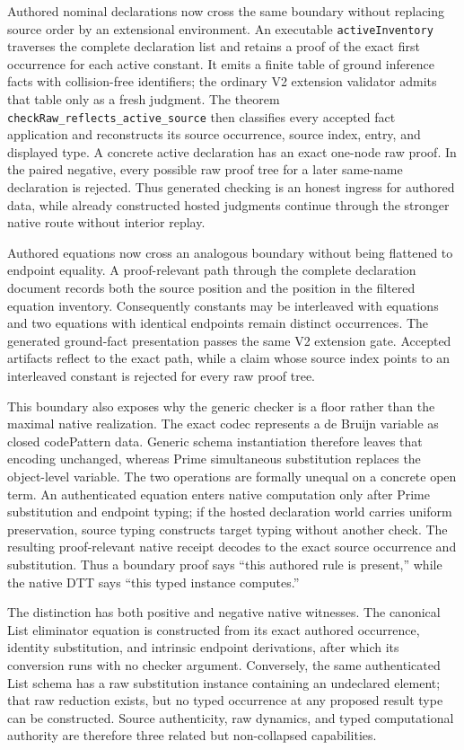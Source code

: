 \documentclass[11pt]{article}
\newcommand{\code}[1]{\texttt{#1}}
\begin{document}
Authored nominal declarations now cross the same boundary without replacing
source order by an extensional environment.  An executable
\code{activeInventory} traverses the complete declaration list and retains a
proof of the exact first occurrence for each active constant.  It emits a
finite table of ground inference facts with collision-free identifiers; the
ordinary V2 extension validator admits that table only as a fresh judgment.
The theorem \code{checkRaw\_reflects\_active\_source} then classifies every
accepted fact application and reconstructs its source occurrence, source
index, entry, and displayed type.  A concrete active declaration has an exact
one-node raw proof.  In the paired negative, every possible raw proof tree for
a later same-name declaration is rejected.  Thus generated checking is an
honest ingress for authored data, while already constructed hosted judgments
continue through the stronger native route without interior replay.

Authored equations now cross an analogous boundary without being flattened to
endpoint equality.  A proof-relevant path through the complete declaration
document records both the source position and the position in the filtered
equation inventory.  Consequently constants may be interleaved with equations
and two equations with identical endpoints remain distinct occurrences.  The
generated ground-fact presentation passes the same V2 extension gate.  Accepted
artifacts reflect to the exact path, while a claim whose source index points to
an interleaved constant is rejected for every raw proof tree.

This boundary also exposes why the generic checker is a floor rather than the
maximal native realization.  The exact codec represents a de Bruijn variable as
closed code{Pattern} data.  Generic schema instantiation therefore leaves that
encoding unchanged, whereas Prime simultaneous substitution replaces the
object-level variable.  The two operations are formally unequal on a concrete
open term.  An authenticated equation enters native computation only after
Prime substitution and endpoint typing; if the hosted declaration world carries
uniform preservation, source typing constructs target typing without another
check.  The resulting proof-relevant native receipt decodes to the exact source
occurrence and substitution.  Thus a boundary proof says ``this authored rule
is present,'' while the native DTT says ``this typed instance computes.''

The distinction has both positive and negative native witnesses.  The canonical
List eliminator equation is constructed from its exact authored occurrence,
identity substitution, and intrinsic endpoint derivations, after which its
conversion runs with no checker argument.  Conversely, the same authenticated
List schema has a raw substitution instance containing an undeclared element;
that raw reduction exists, but no typed occurrence at any proposed result type
can be constructed.  Source authenticity, raw dynamics, and typed computational
authority are therefore three related but non-collapsed capabilities.
\end{document}
